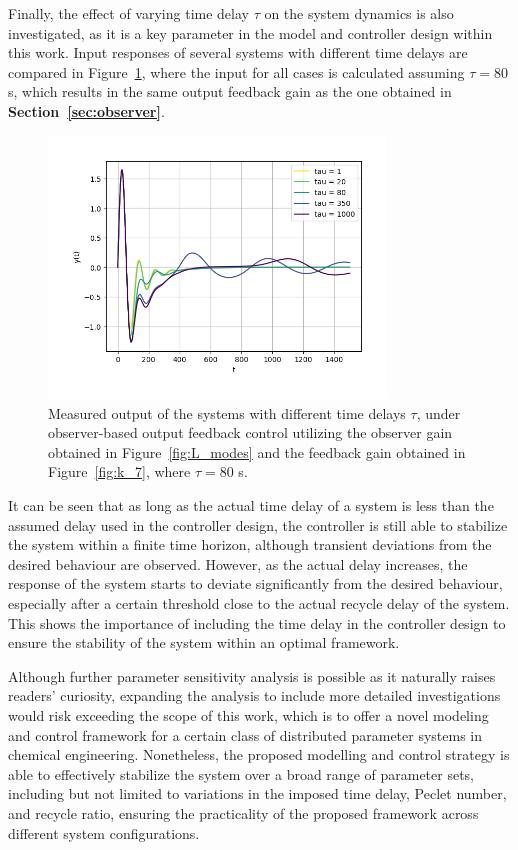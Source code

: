 Finally, the effect of varying time delay $\tau$ on the system dynamics is also investigated, as it is a key parameter in the model and controller design within this work. Input responses of several systems with different time delays are compared in Figure~\ref{fig:tau_sensitivity}, where the input for all cases is calculated assuming $\tau = 80$ s, which results in the same output feedback gain as the one obtained in \textbf{Section~\ref{sec:observer}}.

\begin{figure}[!htbp]
    \centering
    \includegraphics[width=0.8\textwidth]{Figures/y_vs_t.png}
    \caption{Measured output of the systems with different time delays $\tau$, under observer-based output feedback control utilizing the observer gain obtained in Figure~\ref{fig:L_modes} and the feedback gain obtained in Figure~\ref{fig:k_7}, where $\tau = 80$ s.}
    \label{fig:tau_sensitivity}
\end{figure}

It can be seen that as long as the actual time delay of a system is less than the assumed delay used in the controller design, the controller is still able to stabilize the system within a finite time horizon, although transient deviations from the desired behaviour are observed. However, as the actual delay increases, the response of the system starts to deviate significantly from the desired behaviour, especially after a certain threshold close to the actual recycle delay of the system. This shows the importance of including the time delay in the controller design to ensure the stability of the system within an optimal framework.

Although further parameter sensitivity analysis is possible as it naturally raises readers' curiosity, expanding the analysis to include more detailed investigations would risk exceeding the scope of this work, which is to offer a novel modeling and control framework for a certain class of distributed parameter systems in chemical engineering. Nonetheless, the proposed modelling and control strategy is able to effectively stabilize the system over a broad range of parameter sets, including but not limited to variations in the imposed time delay, Peclet number, and recycle ratio, ensuring the practicality of the proposed framework across different system configurations.